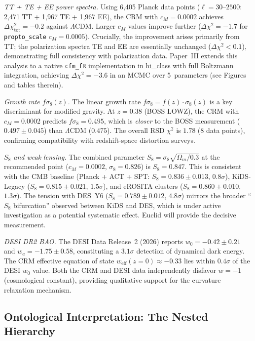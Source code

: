 \documentclass[aps,prd,twocolumn,superscriptaddress,nofootinbib]{revtex4-2}
\begin{document}
\textit{TT + TE + EE power spectra.} Using 6{,}405 Planck data points ($\ell = 30$--$2500$: 2{,}471 TT + 1{,}967 TE + 1{,}967 EE), the CRM with $c_M = 0.0002$ achieves $\Delta\chi^2_{\mathrm{tot}} = -0.2$ against $\Lambda$CDM. Larger $c_M$ values improve further ($\Delta\chi^2 = -1.7$ for \texttt{propto\_scale} $c_M = 0.0005$). Crucially, the improvement arises primarily from TT; the polarization spectra TE and EE are essentially unchanged ($\Delta\chi^2 < 0.1$), demonstrating full consistency with polarization data. Paper~III \cite{Geiger2026c} extends this analysis to a native \texttt{cfm\_fR} implementation in hi\_class with full Boltzmann integration, achieving $\Delta\chi^2 = -3.6$ in an MCMC over 5~parameters (see Figures and tables therein).

\textit{Growth rate $f\sigma_8(z)$.} The linear growth rate $f\sigma_8 = f(z) \cdot \sigma_8(z)$ is a key discriminant for modified gravity. At $z = 0.38$ (BOSS LOWZ), the CRM with $c_M = 0.0002$ predicts $f\sigma_8 = 0.495$, which is \textit{closer} to the BOSS measurement ($0.497 \pm 0.045$) than $\Lambda$CDM ($0.475$). The overall RSD $\chi^2$ is $1.78$ (8 data points), confirming compatibility with redshift-space distortion surveys.

\textit{$S_8$ and weak lensing.} The combined parameter $S_8 = \sigma_8\sqrt{\Omega_m/0.3}$ at the recommended point ($c_M = 0.0002$, $\sigma_8 = 0.826$) is $S_8 = 0.847$. This is consistent with the CMB baseline (Planck + ACT + SPT: $S_8 = 0.836 \pm 0.013$, $0.8\sigma$), KiDS-Legacy ($S_8 = 0.815 \pm 0.021$, $1.5\sigma$), and eROSITA clusters ($S_8 = 0.860 \pm 0.010$, $1.3\sigma$). The tension with DES~Y6 ($S_8 = 0.789 \pm 0.012$, $4.8\sigma$) mirrors the broader ``$S_8$ bifurcation'' observed between KiDS and DES, which is under active investigation as a potential systematic effect. Euclid will provide the decisive measurement.

\textit{DESI DR2 BAO.} The DESI Data Release~2 (2026) reports $w_0 = -0.42 \pm 0.21$ and $w_a = -1.75 \pm 0.58$, constituting a $3.1\sigma$ detection of dynamical dark energy. The CRM effective equation of state $w_{\mathrm{eff}}(z=0) \approx -0.33$ lies within $0.4\sigma$ of the DESI $w_0$ value. Both the CRM and DESI data independently disfavor $w = -1$ (cosmological constant), providing qualitative support for the curvature relaxation mechanism.

\subsection{Ontological Interpretation: The Nested Hierarchy}
\label{subsec:nested}
\end{document}
